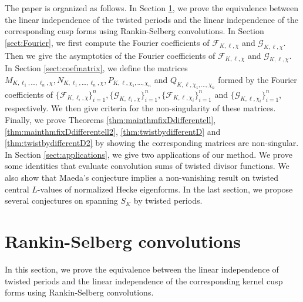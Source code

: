 \documentclass[11pt,letterpaper,reqno]{amsart}
\numberwithin{figure}{section}
\numberwithin{table}{section}
\theoremstyle{definition}
\theoremstyle{plain}
\theoremstyle{definition}
\theoremstyle{definition}
\theoremstyle{remark}
\numberwithin{equation}{section}
\theoremstyle{remark}
\begin{document}
The paper is organized as follows. In Section \ref{sect:rankin-selberg}, we prove the equivalence between the linear independence of the twisted periods and the linear independence of the corresponding cusp forms using Rankin-Selberg convolutions. In Section \ref{sect:Fourier}, we first compute the Fourier coefficients of $\mathcal{F}_{K,\ell,\chi}$ and $\mathcal{G}_{K,\ell,\chi}$. Then we give the asymptotics of the Fourier coefficients of $\mathcal{F}_{K,\ell,\chi}$ and $\mathcal{G}_{K,\ell,\chi}$. In Section \ref{sect:coefmatrix}, we define the matrices $M_{K,\ell_1,...,\ell_n,\chi}, N_{K,\ell_1,...,\ell_n,\chi}, P_{K,\ell,\chi_1,...,\chi_n}$ and $Q_{K,\ell,\chi_1,...,\chi_n}$ formed by the Fourier coefficients of $\{\mathcal{F}_{K,\ell_i,\chi}\}_{i=1}^n, \{\mathcal{G}_{K,\ell_i,\chi}\}_{i=1}^n, \{\mathcal{F}_{K,\ell,\chi_i}\}_{i=1}^n$ and $\{\mathcal{G}_{K,\ell,\chi_i}\}_{i=1}^n$, respectively. We then give criteria for the non-singularity of these matrices. Finally, we prove Theorems \ref{thm:mainthmfixDdifferentell}, \ref{thm:mainthmfixDdifferentell2}, \ref{thm:twistbydifferentD} and \ref{thm:twistbydifferentD2} by showing the corresponding matrices are non-singular. In Section \ref{sect:applications}, we give two applications of our method. We prove some identities that evaluate convolution sums of twisted divisor functions. We also show that Maeda's conjecture implies a non-vanishing result on twisted central $L$-values of normalized Hecke eigenforms. In the last section, we propose several conjectures on spanning $S_K$ by twisted periods.


\section{Rankin-Selberg convolutions}\label{sect:rankin-selberg}
In this section, we prove the equivalence between the linear independence of twisted periods and the linear independence of the corresponding kernel cusp forms using Rankin-Selberg convolutions.  
\end{document}
